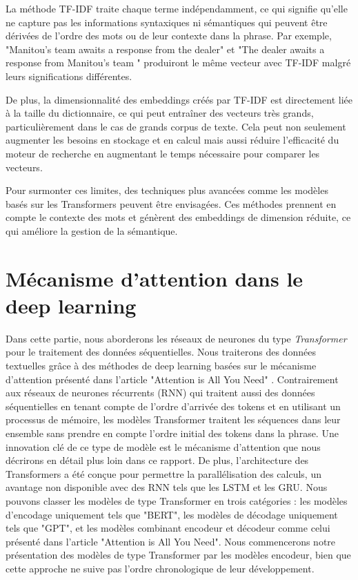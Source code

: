 \documentclass[12pt]{article}
\theoremstyle{definition}
\begin{document}
La méthode TF-IDF traite chaque terme indépendamment, ce qui signifie qu'elle ne capture pas les informations syntaxiques ni sémantiques qui peuvent être dérivées de l'ordre des mots ou de leur contexte dans la phrase. Par exemple, "Manitou's team awaits a response from the dealer" et "The dealer awaits a response from Manitou's team " produiront le même vecteur avec TF-IDF malgré leurs significations différentes. 

De plus, la dimensionnalité des embeddings créés par TF-IDF est directement liée à la taille du dictionnaire, ce qui peut entraîner des vecteurs très grands, particulièrement dans le cas de grands corpus de texte. Cela peut non seulement augmenter les besoins en stockage et en calcul mais aussi réduire l'efficacité du moteur de recherche en augmentant le temps nécessaire pour comparer les vecteurs.

Pour surmonter ces limites, des techniques plus avancées comme les modèles basés sur les Transformers peuvent être envisagées. Ces méthodes prennent en compte le contexte des mots et génèrent des embeddings de dimension réduite, ce qui améliore la gestion de la sémantique.

\section{Mécanisme d'attention dans le deep learning}

Dans cette partie, nous aborderons les réseaux de neurones du type \emph{Transformer} pour le traitement des données séquentielles. Nous traiterons des données textuelles grâce à des méthodes de deep learning basées sur le mécanisme d'attention présenté dans l'article "Attention is All You Need" \cite{a_i_a_y_n}. Contrairement aux réseaux de neurones récurrents (RNN) qui traitent aussi des données séquentielles en tenant compte de l'ordre d'arrivée des tokens et en utilisant un processus de mémoire, les modèles Transformer traitent les séquences dans leur ensemble sans prendre en compte l'ordre initial des tokens dans la phrase. Une innovation clé de ce type de modèle est le mécanisme d'attention que nous décrirons en détail plus loin dans ce rapport. De plus, l'architecture des Transformers a été conçue pour permettre la parallélisation des calculs, un avantage non disponible avec des RNN tels que les LSTM et les GRU. Nous pouvons classer les modèles de type Transformer en trois catégories : les modèles d'encodage uniquement tels que "BERT", les modèles de décodage uniquement tels que "GPT", et les modèles combinant encodeur et décodeur comme celui présenté dans l'article "Attention is All You Need". Nous commencerons notre présentation des modèles de type Transformer par les modèles encodeur, bien que cette approche ne suive pas l'ordre chronologique de leur développement.
\end{document}
